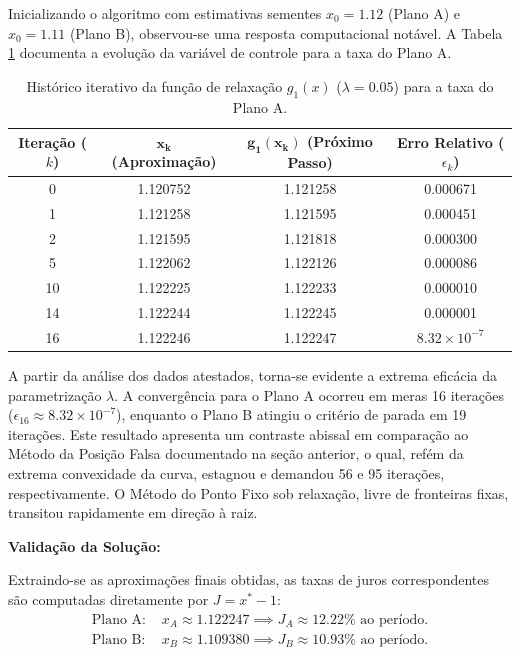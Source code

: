 Inicializando o algoritmo com estimativas sementes $x_0 = 1.12$ (Plano A) e $x_0 = 1.11$ (Plano B), observou-se uma resposta computacional notável. A Tabela \ref{tab:ponto_fixo_juros_g1} documenta a evolução da variável de controle para a taxa do Plano A.

\begin{table}[htpb]
\centering
\caption{Histórico iterativo da função de relaxação $g_1(x)$ ($\lambda=0.05$) para a taxa do Plano A.}
\label{tab:ponto_fixo_juros_g1}
\small
\begin{tabular}{@{}cccc@{}}
\toprule
\textbf{Iteração ($k$)} & $\mathbf{x_k}$ (Aproximação) & $\mathbf{g_1(x_k)}$ (Próximo Passo) & \textbf{Erro Relativo} ($\epsilon_k$) \\ \midrule
0  & 1.120752 & 1.121258 & 0.000671 \\
1  & 1.121258 & 1.121595 & 0.000451 \\
2  & 1.121595 & 1.121818 & 0.000300 \\
5  & 1.122062 & 1.122126 & 0.000086 \\
10 & 1.122225 & 1.122233 & 0.000010 \\
14 & 1.122244 & 1.122245 & 0.000001 \\
16 & 1.122246 & 1.122247 & $8.32 \times 10^{-7}$ \\ \bottomrule
\end{tabular}
\end{table}

A partir da análise dos dados atestados, torna-se evidente a extrema eficácia da parametrização $\lambda$. A convergência para o Plano A ocorreu em meras 16 iterações ($\epsilon_{16} \approx 8.32 \times 10^{-7}$), enquanto o Plano B atingiu o critério de parada em 19 iterações. Este resultado apresenta um contraste abissal em comparação ao Método da Posição Falsa documentado na seção anterior, o qual, refém da extrema convexidade da curva, estagnou e demandou 56 e 95 iterações, respectivamente. O Método do Ponto Fixo sob relaxação, livre de fronteiras fixas, transitou rapidamente em direção à raiz.

\textbf{Validação da Solução:}

Extraindo-se as aproximações finais obtidas, as taxas de juros correspondentes são computadas diretamente por $J = x^* - 1$:
\begin{align}
    \text{Plano A: } & x_A \approx 1.122247 \implies J_A \approx 12.22\% \text{ ao período.} \\
    \text{Plano B: } & x_B \approx 1.109380 \implies J_B \approx 10.93\% \text{ ao período.}
\end{align}

